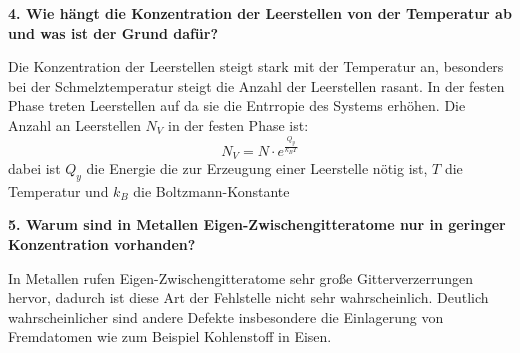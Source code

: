 \noindent\textbf{4. Wie hängt die Konzentration der Leerstellen von der Temperatur ab und was ist der Grund dafür?}\\
\begin{addmargin}[25pt]{0pt}    
Die Konzentration der Leerstellen steigt stark mit der Temperatur an, besonders bei der Schmelztemperatur steigt die Anzahl der Leerstellen rasant. In der festen Phase treten Leerstellen auf da sie die Entrropie des Systems erhöhen. Die Anzahl an Leerstellen $N_V$ in der festen Phase ist: 
\begin{equation}\label{eq:Anzahl_Leerstellen}
    N_V = N\cdot e^{\frac{Q_y}{k_BT}}
\end{equation}
dabei ist $Q_y$ die Energie die zur Erzeugung einer Leerstelle nötig ist, $T$ die Temperatur und $k_B$ die Boltzmann-Konstante\\
\end{addmargin}

\noindent\textbf{5. Warum sind in Metallen Eigen-Zwischengitteratome nur in geringer Konzentration vorhanden?}\\
\begin{addmargin}[25pt]{0pt}  
In Metallen rufen Eigen-Zwischengitteratome sehr große Gitterverzerrungen hervor, dadurch ist diese Art der Fehlstelle nicht sehr wahrscheinlich. Deutlich wahrscheinlicher sind andere Defekte insbesondere die Einlagerung von Fremdatomen wie zum Beispiel Kohlenstoff in Eisen.\\
\end{addmargin}

